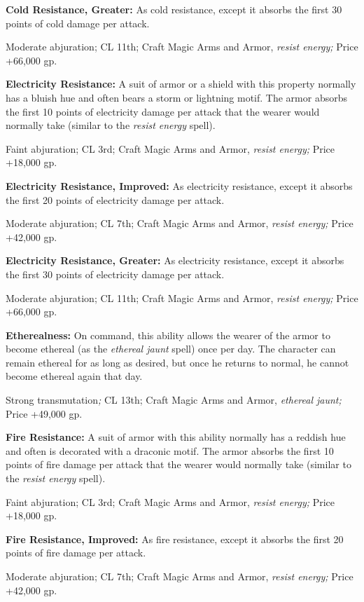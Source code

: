 \textbf{Cold Resistance, Greater:} As cold resistance, except it absorbs the first 
30 points of cold damage per attack.

Moderate abjuration; CL 11th; Craft Magic Arms and Armor, \textit{resist energy; 
}Price +66,000 gp.

\textbf{Electricity Resistance:} A suit of armor or a shield with this property 
normally has a bluish hue and often bears a storm or lightning motif. The armor 
absorbs the first 10 points of electricity damage per attack that the wearer would 
normally take (similar to the \textit{resist energy }spell).

Faint abjuration; CL 3rd; Craft Magic Arms and Armor, \textit{resist energy; }Price 
+18,000 gp.

\textbf{Electricity Resistance, Improved: }As electricity resistance, except it 
absorbs the first 20 points of electricity damage per attack.

Moderate abjuration; CL 7th; Craft Magic Arms and Armor, \textit{resist energy; 
}Price +42,000 gp.

\textbf{Electricity Resistance, Greater: }As electricity resistance, except it 
absorbs the first 30 points of electricity damage per attack.

Moderate abjuration; CL 11th; Craft Magic Arms and Armor, \textit{resist energy; 
}Price +66,000 gp.

\textbf{Etherealness:} On command, this ability allows the wearer of the armor 
to become ethereal (as the \textit{ethereal jaunt }spell) once per day. The character 
can remain ethereal for as long as desired, but once he returns to normal, he cannot 
become ethereal again that day.

Strong transmutation\textit{; }CL 13th; Craft Magic Arms and Armor, \textit{ethereal 
jaunt; }Price +49,000 gp.

\textbf{Fire Resistance:} A suit of armor with this ability normally has a reddish 
hue and often is decorated with a draconic motif. The armor absorbs the first 10 
points of fire damage per attack that the wearer would normally take (similar to 
the \textit{resist energy }spell).

Faint abjuration; CL 3rd; Craft Magic Arms and Armor, \textit{resist energy; }Price 
+18,000 gp.

\textbf{Fire Resistance, Improved: }As fire resistance, except it absorbs the first 
20 points of fire damage per attack.

Moderate abjuration; CL 7th; Craft Magic Arms and Armor, \textit{resist energy; 
}Price +42,000 gp.

